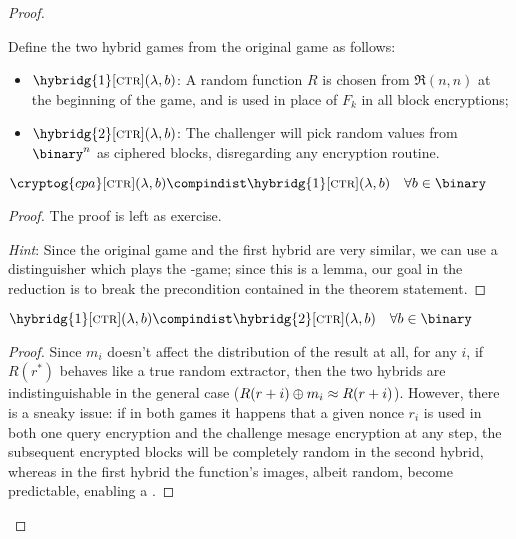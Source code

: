 \begin{proof}
\begin{cryptogame}
        \cseqendloop

        \cseqdelay
        

    \end{cryptogame}

    Define the two hybrid games from the original \cpa{} game as follows:

    \begin{itemize}
        \item $\hybridg{1}[\textsc{ctr}](\lambda, b)$: A random function $R$ is chosen \uar{} from $\mathfrak{R}(n, n)$ at the beginning of the game, and is used in place of $F_k$ in all block encryptions;
        \item $\hybridg{2}[\textsc{ctr}](\lambda, b)$: The challenger will pick random values from $\binary^n$ as ciphered blocks, disregarding any encryption routine.
    \end{itemize}

    \begin{lemma}
        $\cryptog{cpa}[\textsc{ctr}](\lambda, b) \compindist \hybridg{1}[\textsc{ctr}](\lambda, b) \quad \forall b \in \binary$
    \end{lemma}

    \begin{proof} The proof is left as exercise.
        
        \emph{Hint}: Since the original game and the first hybrid are very similar, we can use a distinguisher which plays the \cpa-game; since this is a lemma, our goal in the reduction is to break the precondition contained in the theorem statement.
    \end{proof}

    \begin{lemma}
        $\hybridg{1}[\textsc{ctr}](\lambda, b) \compindist \hybridg{2}[\textsc{ctr}](\lambda, b) \quad \forall b \in \binary$
    \end{lemma}

    \begin{proof}
    
        Since $m_i$ doesn't affect the distribution of the result at all, for any $i$, if $R(r^{*})$ behaves like a true random extractor, then the two hybrids are indistinguishable in the general case ($R(r + i) \oplus m_i \approx R(r + i)$). However, there is a sneaky issue: if in both games it happens that a given nonce $r_i$ is used in both one query encryption and the challenge mesage encryption at any step, the subsequent encrypted blocks will be completely random in the second hybrid, whereas in the first hybrid the function's images, albeit random, become predictable, enabling a \cpa.


\end{proof}
\end{proof}
